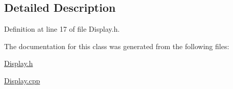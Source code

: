 \subsection{Detailed Description}


Definition at line 17 of file Display.\+h.



The documentation for this class was generated from the following files\+:\begin{DoxyCompactItemize}
\item 
\hyperlink{_display_8h}{Display.\+h}\item 
\hyperlink{_display_8cpp}{Display.\+cpp}\end{DoxyCompactItemize}

